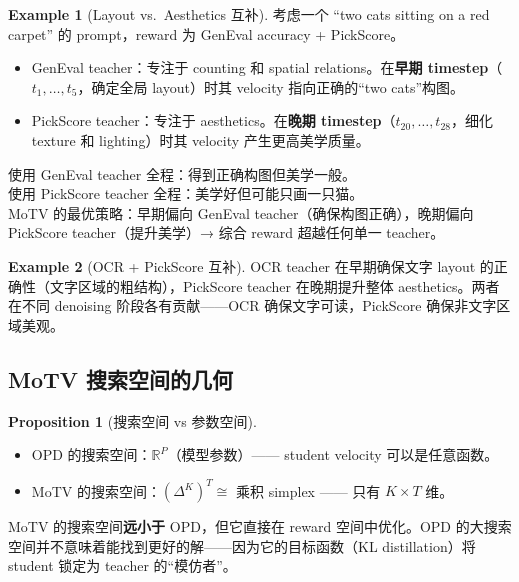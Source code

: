\documentclass[11pt,a4paper]{article}
\newcommand{\R}{\mathbb{R}}
\theoremstyle{definition}
\newtheorem{proposition}{Proposition}
\newtheorem{example}{Example}
\begin{document}
\begin{example}[Layout vs.\ Aesthetics 互补]
考虑一个 ``two cats sitting on a red carpet'' 的 prompt，reward 为 GenEval accuracy + PickScore。

\begin{itemize}
\item GenEval teacher：专注于 counting 和 spatial relations。在\textbf{早期 timestep}（$t_1, \ldots, t_5$，确定全局 layout）时其 velocity 指向正确的``two cats''构图。
\item PickScore teacher：专注于 aesthetics。在\textbf{晚期 timestep}（$t_{20}, \ldots, t_{28}$，细化 texture 和 lighting）时其 velocity 产生更高美学质量。
\end{itemize}

使用 GenEval teacher 全程：得到正确构图但美学一般。\\
使用 PickScore teacher 全程：美学好但可能只画一只猫。\\
MoTV 的最优策略：早期偏向 GenEval teacher（确保构图正确），晚期偏向 PickScore teacher（提升美学）→ 综合 reward 超越任何单一 teacher。
\end{example}

\begin{example}[OCR + PickScore 互补]
OCR teacher 在早期确保文字 layout 的正确性（文字区域的粗结构），PickScore teacher 在晚期提升整体 aesthetics。两者在不同 denoising 阶段各有贡献——OCR 确保文字可读，PickScore 确保非文字区域美观。
\end{example}

\subsection{MoTV 搜索空间的几何}

\begin{proposition}[搜索空间 vs 参数空间]
\begin{itemize}
\item OPD 的搜索空间：$\R^P$（模型参数）—— student velocity 可以是任意函数。
\item MoTV 的搜索空间：$(\Delta^K)^T \cong$ 乘积 simplex —— 只有 $K \times T$ 维。
\end{itemize}

MoTV 的搜索空间\textbf{远小于} OPD，但它直接在 reward 空间中优化。OPD 的大搜索空间并不意味着能找到更好的解——因为它的目标函数（KL distillation）将 student 锁定为 teacher 的``模仿者''。
\end{proposition}

\end{document}
